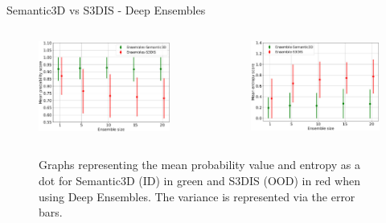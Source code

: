 \documentclass[aspectratio=169]{beamer}
\begin{document}
\begin{frame}{Semantic3D vs S3DIS - Deep Ensembles}
    \begin{columns}
        \begin{column}{0.5\textwidth}
            \begin{figure}
                \centering
                \includegraphics[scale=0.28]{images/ood1/MSP_Mean_OOD1_DE.jpg}
            \end{figure}
        \end{column}
        \begin{column}{0.5\textwidth}
            \begin{figure}
                \centering
                \includegraphics[scale=0.28]{images/ood1/Ent_Mean_OOD1_DE.jpg}
            \end{figure}
        \end{column}
    \end{columns}
    \begin{figure}
        \caption{Graphs representing the mean probability value and entropy as a dot for Semantic3D (ID) in green and
        S3DIS (OOD) in red when using Deep Ensembles. The variance is represented via the error bars.}
    \end{figure}
\end{frame}
\end{document}
